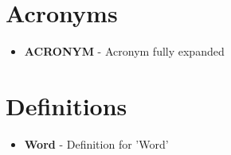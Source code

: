 \pagebreak
\appendix

\section{Acronyms}
\begin{itemize}
    \item \textbf{ACRONYM} - Acronym fully expanded 
\end{itemize}

\section{Definitions}
\begin{itemize}
    \item \textbf{Word} - Definition for 'Word' 
\end{itemize}


